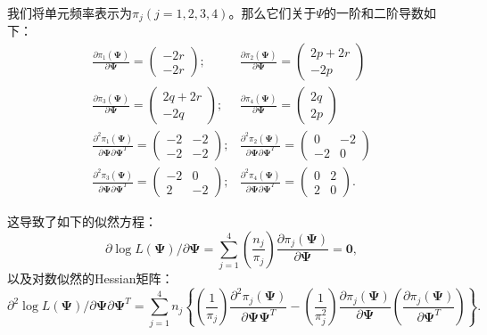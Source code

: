 \documentclass[UTF8,12pt]{ctexart}
\numberwithin{equation}{section}%
\begin{document}
	我们将单元频率表示为$\pi_j(j=1,2,3,4)$。那么它们关于$\Psi$的一阶和二阶导数如下：
	$$
	\begin{array}{cc}
		\frac{\partial \pi_1(\boldsymbol{\Psi})}{\partial \boldsymbol{\Psi}}=\left(\begin{array}{c}
			-2 r \\
			-2 r
		\end{array}\right) ; & \frac{\partial \pi_2(\boldsymbol{\Psi})}{\partial \boldsymbol{\Psi}}=\left(\begin{array}{r}
		   2p+2r \\
			-2 p
		\end{array}\right) \\
		\frac{\partial \pi_3(\boldsymbol{\Psi})}{\partial \boldsymbol{\Psi}}=\left(\begin{array}{r}
			2 q+2r \\
			-2 q
		\end{array}\right) ; & \frac{\partial \pi_4(\boldsymbol{\Psi})}{\partial \boldsymbol{\Psi}}=\left(\begin{array}{c}
			2 q \\
			2 p
		\end{array}\right) \\
		\frac{\partial^2 \pi_1(\boldsymbol{\Psi})}{\partial \boldsymbol{\Psi} \partial \boldsymbol{\Psi}^T}=\left(\begin{array}{cc}
			-2 & -2 \\
			-2 & -2
		\end{array}\right) ; & \frac{\partial^2 \pi_2(\boldsymbol{\Psi})}{\partial \boldsymbol{\Psi} \partial \boldsymbol{\Psi}^T}=\left(\begin{array}{rr}
			0 & -2 \\
			-2 & 0
		\end{array}\right) \\
		\frac{\partial^2 \pi_3(\boldsymbol{\Psi})}{\partial \boldsymbol{\Psi} \partial \boldsymbol{\Psi}^T}=\left(\begin{array}{rr}
			-2 & 0 \\
			2 & -2
		\end{array}\right) ; & \frac{\partial^2 \pi_4(\boldsymbol{\Psi})}{\partial \boldsymbol{\Psi} \partial \boldsymbol{\Psi}^T}=\left(\begin{array}{cc}
			0 & 2 \\
			2 & 0
		\end{array}\right) .
	\end{array}
	$$
	
	这导致了如下的似然方程：
	$$
	\partial \log L(\boldsymbol{\Psi}) / \partial \boldsymbol{\Psi}=\sum_{j=1}^4\left(\frac{n_j}{\pi_j}\right) \frac{\partial \pi_j(\boldsymbol{\Psi})}{\partial \boldsymbol{\Psi}}=\mathbf{0},
	$$
	以及对数似然的Hessian矩阵：
	$$
	\partial^2 \log L(\boldsymbol{\Psi}) / \partial \boldsymbol{\Psi} \partial \boldsymbol{\Psi}^T=\sum_{j=1}^4 n_j\left\{\left(\frac{1}{\pi_j}\right) \frac{\partial^2 \pi_j(\boldsymbol{\Psi})}{\partial \boldsymbol{\Psi} \boldsymbol{\Psi}^T}-\left(\frac{1}{\pi_j^2}\right) \frac{\partial \pi_j(\boldsymbol{\Psi})}{\partial \boldsymbol{\Psi}}\left(\frac{\partial \pi_j(\boldsymbol{\Psi})}{\partial \boldsymbol{\Psi}^T}\right)\right\} .
	$$
	
\end{document}
